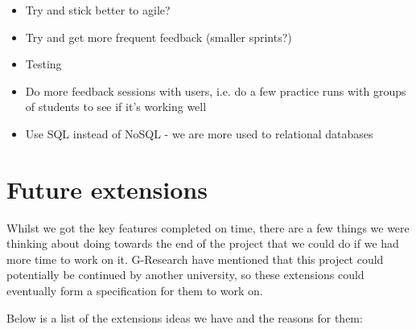 \begin{itemize}
    \item
        Try and stick better to agile?
    \item
        Try and get more frequent feedback (smaller sprints?)
    \item
        Testing
    \item
        Do more feedback sessions with users, i.e. do a few practice runs with
        groups of students to see if it's working well
    \item
        Use SQL instead of NoSQL - we are more used to relational databases
\end{itemize}

\section{Future extensions}

Whilst we got the key features completed on time, there are a few things we were 
thinking about doing towards the end of the project that we could do if we had
more time to work on it. G-Research have mentioned that this project could
potentially be continued by another university, so these extensions could
eventually form a specification for them to work on.

Below is a list of the extensions ideas we have and the reasons for them:


